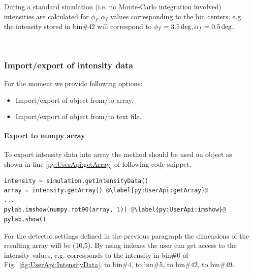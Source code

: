 During a standard simulation (i.e. no Monte-Carlo integration involved) intensities are calculated for $\phi_f, \alpha_f$ values corresponding to the bin centers, e.g. the intensity stored in bin\#42 will correspond to $\phi_f=3.5\,{\rm deg}, \alpha_f=0.5\,{\rm deg}$.
\vspace*{2mm}


\\



\subsubsection{Import/export of intensity data}
For the moment we provide following options:
\begin{itemize}
\item Import/export of  object from/to  array.
\item Import/export of  object from/to text file.

\end{itemize}

\paragraph{Export to numpy array}

To export intensity data into   array the method  should be used
on  object as shown in line \ref{py:UserApi:getArray} of
following code snippet.

\begin{lstlisting}[language=python, style=eclipseboxed]
intensity = simulation.getIntensityData()
array = intensity.getArray() @\label{py:UserApi:getArray}@
...
pylab.imshow(numpy.rot90(array, 1)) @\label{py:UserApi:imshow}@
pylab.show()
\end{lstlisting}

For the detector settings defined in the previous paragraph the dimensions of the resulting array will be (10,5). By using  indexes the user can get access to the intensity values, e.g.
 corresponds to the intensity in bin\#0 of Fig.~\ref{fig:UserApi:IntensityData},
 to bin\#4,
 to bin\#5,
 to bin\#42,
 to bin\#49.


